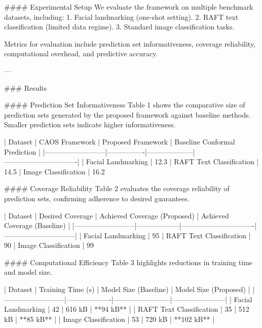 #### Experimental Setup
We evaluate the framework on multiple benchmark datasets, including:
1. Facial landmarking (one-shot setting).
2. RAFT text classification (limited data regime).
3. Standard image classification tasks.

Metrics for evaluation include prediction set informativeness, coverage reliability, computational overhead, and predictive accuracy.

---

### Results

#### Prediction Set Informativeness
Table 1 shows the comparative size of prediction sets generated by the proposed framework against baseline methods. Smaller prediction sets indicate higher informativeness.

| Dataset                  | CAOS Framework | Proposed Framework | Baseline Conformal Prediction |
|--------------------------|----------------|--------------------|-------------------------------|
| Facial Landmarking       | 12.3%
| RAFT Text Classification | 14.5%
| Image Classification     | 16.2%

#### Coverage Reliability
Table 2 evaluates the coverage reliability of prediction sets, confirming adherence to desired guarantees.

| Dataset                  | Desired Coverage | Achieved Coverage (Proposed) | Achieved Coverage (Baseline) |
|--------------------------|------------------|-------------------------------|------------------------------|
| Facial Landmarking       | 95%
| RAFT Text Classification | 90%
| Image Classification     | 99%

#### Computational Efficiency
Table 3 highlights reductions in training time and model size.

| Dataset                  | Training Time (s) | Model Size (Baseline) | Model Size (Proposed) |
|--------------------------|-------------------|------------------------|-----------------------|
| Facial Landmarking       | 42               | 616 kB                | **94 kB**            |
| RAFT Text Classification | 35               | 512 kB                | **85 kB**            |
| Image Classification     | 53               | 720 kB                | **102 kB**           |

